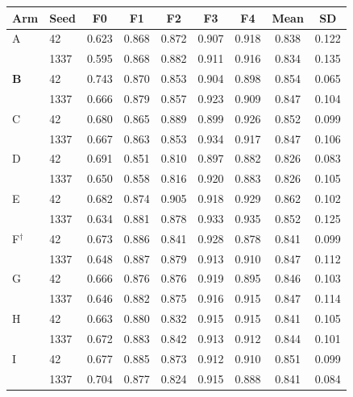 \begin{tabular}{@{}ll@{\hspace{4pt}}ccccc@{\hspace{4pt}}cc@{}}
\toprule
Arm & Seed & F0 & F1 & F2 & F3 & F4 & Mean & SD\\
\midrule
A & 42 & 0.623 & 0.868 & 0.872 & 0.907 & 0.918 & 0.838 & 0.122 \\
 & 1337 & 0.595 & 0.868 & 0.882 & 0.911 & 0.916 & 0.834 & 0.135 \\
\textbf{B} & 42 & 0.743 & 0.870 & 0.853 & 0.904 & 0.898 & 0.854 & 0.065 \\
 & 1337 & 0.666 & 0.879 & 0.857 & 0.923 & 0.909 & 0.847 & 0.104 \\
C & 42 & 0.680 & 0.865 & 0.889 & 0.899 & 0.926 & 0.852 & 0.099 \\
 & 1337 & 0.667 & 0.863 & 0.853 & 0.934 & 0.917 & 0.847 & 0.106 \\
D & 42 & 0.691 & 0.851 & 0.810 & 0.897 & 0.882 & 0.826 & 0.083 \\
 & 1337 & 0.650 & 0.858 & 0.816 & 0.920 & 0.883 & 0.826 & 0.105 \\
E & 42 & 0.682 & 0.874 & 0.905 & 0.918 & 0.929 & 0.862 & 0.102 \\
 & 1337 & 0.634 & 0.881 & 0.878 & 0.933 & 0.935 & 0.852 & 0.125 \\
F$^\dagger$ & 42 & 0.673 & 0.886 & 0.841 & 0.928 & 0.878 & 0.841 & 0.099 \\
 & 1337 & 0.648 & 0.887 & 0.879 & 0.913 & 0.910 & 0.847 & 0.112 \\
G & 42 & 0.666 & 0.876 & 0.876 & 0.919 & 0.895 & 0.846 & 0.103 \\
 & 1337 & 0.646 & 0.882 & 0.875 & 0.916 & 0.915 & 0.847 & 0.114 \\
H & 42 & 0.663 & 0.880 & 0.832 & 0.915 & 0.915 & 0.841 & 0.105 \\
 & 1337 & 0.672 & 0.883 & 0.842 & 0.913 & 0.912 & 0.844 & 0.101 \\
I & 42 & 0.677 & 0.885 & 0.873 & 0.912 & 0.910 & 0.851 & 0.099 \\
 & 1337 & 0.704 & 0.877 & 0.824 & 0.915 & 0.888 & 0.841 & 0.084 \\
\bottomrule
\end{tabular}
